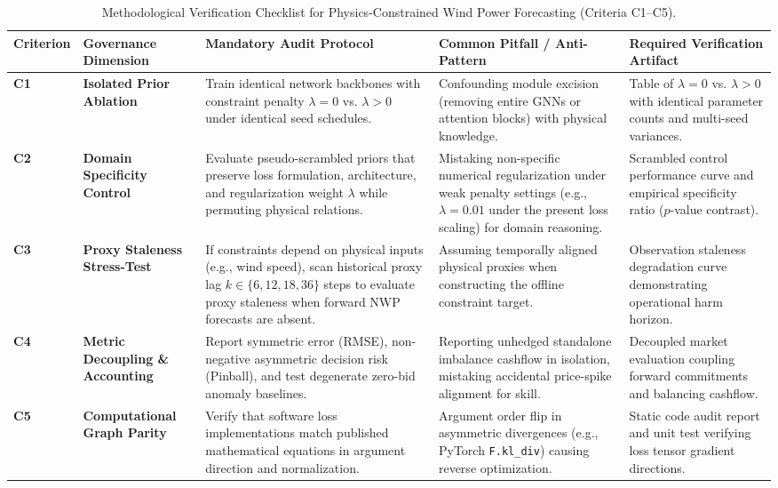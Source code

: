 \begin{table}[!t]
\centering
\footnotesize
\renewcommand{\arraystretch}{0.88}
\setlength{\tabcolsep}{3.5pt}
\caption{Methodological Verification Checklist for Physics-Constrained Wind Power Forecasting (Criteria C1--C5).}
\label{tab:verification_checklist}
\begin{threeparttable}
\begin{tabularx}{\textwidth}{p{1.4cm}p{2.6cm}>{\raggedright\arraybackslash}X>{\raggedright\arraybackslash}Xp{3.2cm}}
\toprule
\textbf{Criterion} & \textbf{Governance Dimension} & \textbf{Mandatory Audit Protocol} & \textbf{Common Pitfall / Anti-Pattern} & \textbf{Required Verification Artifact} \\
\midrule
\textbf{C1} & \textbf{Isolated Prior Ablation} & Train identical network backbones with constraint penalty $\lambda=0$ vs. $\lambda>0$ under identical seed schedules. & Confounding module excision (removing entire GNNs or attention blocks) with physical knowledge. & Table of $\lambda=0$ vs. $\lambda>0$ with identical parameter counts and multi-seed variances. \\
\midrule
\textbf{C2} & \textbf{Domain Specificity Control} & Evaluate pseudo-scrambled priors that preserve loss formulation, architecture, and regularization weight $\lambda$ while permuting physical relations. & Mistaking non-specific numerical regularization under weak penalty settings (e.g., $\lambda = 0.01$ under the present loss scaling) for domain reasoning. & Scrambled control performance curve and empirical specificity ratio ($p$-value contrast). \\
\midrule
\textbf{C3} & \textbf{Proxy Staleness Stress-Test} & If constraints depend on physical inputs (e.g., wind speed), scan historical proxy lag $k \in \{6, 12, 18, 36\}$ steps to evaluate proxy staleness when forward NWP forecasts are absent. & Assuming temporally aligned physical proxies when constructing the offline constraint target. & Observation staleness degradation curve demonstrating operational harm horizon. \\
\midrule
\textbf{C4} & \textbf{Metric Decoupling \& Accounting} & Report symmetric error (RMSE), non-negative asymmetric decision risk (Pinball), and test degenerate zero-bid anomaly baselines. & Reporting unhedged standalone imbalance cashflow in isolation, mistaking accidental price-spike alignment for skill. & Decoupled market evaluation coupling forward commitments and balancing cashflow. \\
\midrule
\textbf{C5} & \textbf{Computational Graph Parity} & Verify that software loss implementations match published mathematical equations in argument direction and normalization. & Argument order flip in asymmetric divergences (e.g., PyTorch \texttt{F.kl\_div}) causing reverse optimization. & Static code audit report and unit test verifying loss tensor gradient directions. \\

\end{tabularx}
\end{threeparttable}
\end{table}
